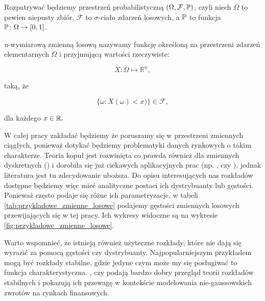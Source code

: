 Rozpatrywać będziemy przestrzeń probabilistyczną $(\Omega,\mathcal{F},\mathbb{P})$, czyli niech $\Omega$ to pewien niepusty zbiór, $\mathcal{F}$ to $\sigma$-ciało zdarzeń losowych, a $\mathbb{P}$ to funkcja $\mathbb{P}\colon\Omega\rightarrow[0,1]$. 

\begin{df}\cite{Rachunek_prob}
	\label{df:n_wym_zmienna_losowa}
	\textit{n}-wymiarową zmienną losową nazywamy funkcję określoną na przestrzeni zdarzeń elementarnych $\Omega$ i przyjmującą wartości rzeczywiste:
	
	$$ X\colon \Omega \mapsto \mathbb{R}^{n}, $$

	taką, że
	
	$$ \{ \omega \colon X(\omega) < x) \} \in \mathcal{F},$$
	
	dla każdego $x \in \mathbb{R}.$
\end{df}

W całej pracy zakładać będziemy że poruszamy się w przestrzeni zmiennych ciągłych, ponieważ dotykać będziemy problematyki danych rynkowych o takim charakterze. Teoria kopuł jest rozwinięta co prawda również dla zmiennych dyskretnych (\cite{Genest_Discrete_Copulas}) i dorobiła się już ciekawych aplikacyjnych prac (np. \cite{Koopman_DiscreteCopula_HTF}, czy \cite{Shefzik_Weather}), jednak literatura jest tu zdecydowanie uboższa. Do opisu interesujących nas rozkładów dostępne będziemy więc mieć analityczne postaci ich dystrybuanty lub gęstości. Ponieważ często podaje się różne ich parametryzacje, w tabeli \ref{tab:przykladowe_zmienne_losowe} podajemy gęstości zmiennych losowych przewijających się w tej pracy. Ich wykresy widoczne są na wykresie \ref{fig:przykladowe_zmienne_losowe}.

Warto wspomnieć, że istnieją również użyteczne rozkłady, które nie dają się wyrazić za pomocą gęstości czy dystrybuanty. Najpopularniejszym przykładem mogą być rozkłady stabilne, gdzie jedyne czym może my się posługiwać to funkcja charakterystyczna.  \cite{Stable_Distributions1}, czy \cite{Stable_Distributions2} podają bardzo dobry przegląd teorii rozkładów stabilnych i pokazują ich przewagę w kontekście modelowania nie-gaussowskich zwrotów na rynkach finansowych.

